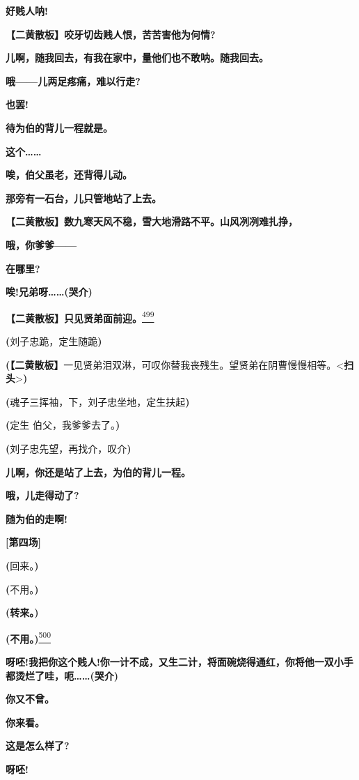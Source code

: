 \textbf{好贱人呐!}

\textbf{【二黄散板】咬牙切齿贱人恨，苦苦害他为何情?}

\textbf{儿啊，随我回去，有我在家中，量他们也不敢呐。随我回去。}

\textbf{哦------儿两足疼痛，难以行走?}

\textbf{也罢!}

\textbf{待为伯的背儿一程就是。}

\textbf{这个\ldots{}\ldots{}}

\textbf{唉，伯父虽老，还背得儿动。}

\textbf{那旁有一石台，儿只管地站了上去。}

\textbf{【二黄散板】数九寒天风不稳，雪大地滑路不平。山风冽冽难扎挣，}

\textbf{哦，你爹爹------}

\textbf{在哪里?}

\textbf{唉!兄弟呀\ldots{}\ldots{}(哭介)}

\textbf{【二黄散板】只见贤弟面前迎。}\protect\hyperlink{fn499}{\textsuperscript{499}}

\textbf{(}刘子忠跪，定生随跪\textbf{)}

\textbf{(【二黄散板】}一见贤弟泪双淋，可叹你替我丧残生。望贤弟在阴曹慢慢相等。\textless{}\textbf{扫头}\textgreater{}\textbf{)}

\textbf{(}魂子三挥袖，下，刘子忠坐地，定生扶起\textbf{)}

\textbf{(}定生 伯父，我爹爹去了。\textbf{)}

\textbf{(}刘子忠先望，再找介，叹介\textbf{)}

\textbf{儿啊，你还是站了上去，为伯的背儿一程。}

\textbf{哦，儿走得动了?}

\textbf{随为伯的走啊!}

\textbf{{[}第四场{]}}

\textbf{(}回来。\textbf{)}

\textbf{(}不用。\textbf{)}

\textbf{(转来。)}

\textbf{(不用。)}\protect\hyperlink{fn500}{\textsuperscript{500}}

\textbf{呀呸!我把你这个贱人!你一计不成，又生二计，将面碗烧得通红，你将他一双小手都烫烂了哇，呃\ldots{}\ldots{}(哭介)}

\textbf{你又不曾。}

\textbf{你来看。}

\textbf{这是怎么样了?}

\textbf{呀呸!}

